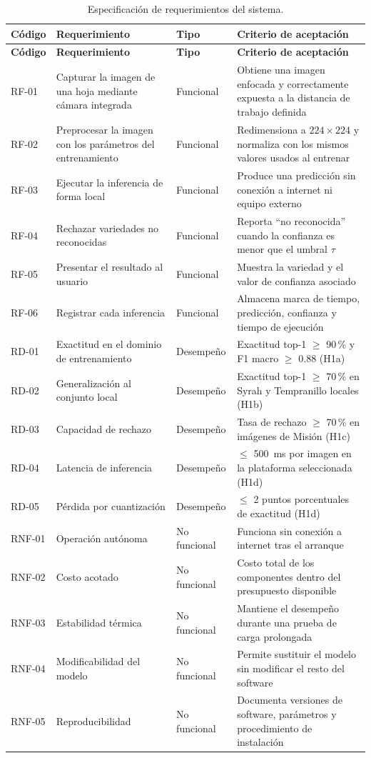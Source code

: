 \begin{longtable}{L{1.5cm}L{4.9cm}L{2.0cm}L{4.9cm}}
\caption{Especificación de requerimientos del sistema.}
\label{tab:requerimientos} \\
\toprule
\textbf{Código} & \textbf{Requerimiento} & \textbf{Tipo} & \textbf{Criterio de aceptación} \\
\midrule
\endfirsthead
\toprule
\textbf{Código} & \textbf{Requerimiento} & \textbf{Tipo} & \textbf{Criterio de aceptación} \\
\midrule
\endhead
RF-01 & Capturar la imagen de una hoja mediante cámara integrada & Funcional & Obtiene una imagen enfocada y correctamente expuesta a la distancia de trabajo definida \\
RF-02 & Preprocesar la imagen con los parámetros del entrenamiento & Funcional & Redimensiona a $224\times224$ y normaliza con los mismos valores usados al entrenar \\
RF-03 & Ejecutar la inferencia de forma local & Funcional & Produce una predicción sin conexión a internet ni equipo externo \\
RF-04 & Rechazar variedades no reconocidas & Funcional & Reporta ``no reconocida'' cuando la confianza es menor que el umbral $\tau$ \\
RF-05 & Presentar el resultado al usuario & Funcional & Muestra la variedad y el valor de confianza asociado \\
RF-06 & Registrar cada inferencia & Funcional & Almacena marca de tiempo, predicción, confianza y tiempo de ejecución \\
RD-01 & Exactitud en el dominio de entrenamiento & Desempeño & Exactitud top-1 $\geq$ 90\,\% y F1 macro $\geq$ 0.88 (H1a) \\
RD-02 & Generalización al conjunto local & Desempeño & Exactitud top-1 $\geq$ 70\,\% en Syrah y Tempranillo locales (H1b) \\
RD-03 & Capacidad de rechazo & Desempeño & Tasa de rechazo $\geq$ 70\,\% en imágenes de Misión (H1c) \\
RD-04 & Latencia de inferencia & Desempeño & $\leq$ 500~ms por imagen en la plataforma seleccionada (H1d) \\
RD-05 & Pérdida por cuantización & Desempeño & $\leq$ 2 puntos porcentuales de exactitud (H1d) \\
RNF-01 & Operación autónoma & No funcional & Funciona sin conexión a internet tras el arranque \\
RNF-02 & Costo acotado & No funcional & Costo total de los componentes dentro del presupuesto disponible \\
RNF-03 & Estabilidad térmica & No funcional & Mantiene el desempeño durante una prueba de carga prolongada \\
RNF-04 & Modificabilidad del modelo & No funcional & Permite sustituir el modelo sin modificar el resto del software \\
RNF-05 & Reproducibilidad & No funcional & Documenta versiones de software, parámetros y procedimiento de instalación \\
\bottomrule
\end{longtable}

